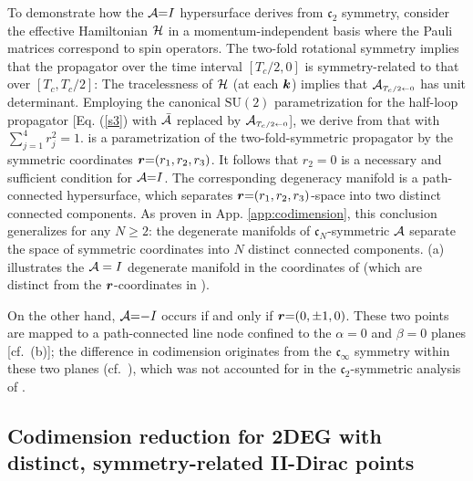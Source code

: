 \documentclass[aps, showpacs, twocolumn, notitlepage, superscriptaddress]{revtex4-1}
\begin{document}
To demonstrate how the ${\cal A}{=}I$ hypersurface derives from $\mathfrak{c}_2$ symmetry, consider  the effective Hamiltonian ${\cal H}$ 
in a momentum-independent basis where the Pauli matrices correspond to spin operators. The two-fold rotational symmetry 
implies that the propagator over the time interval $[T_c/2,0]$ is symmetry-related to that over $[T_c,T_c/2]$:
The tracelessness of ${\cal H}$ (at each $\boldsymbol{k}$) implies that  ${{\cal A}}_{\scriptscriptstyle{T_c/2\leftarrow 0}}$  has unit determinant. Employing the canonical $\text{SU}(2)$ parametrization for the half-loop propagator [Eq. (\ref{s3}) with ${\cal \bar{A}}$ replaced by ${{\cal A}}_{\scriptscriptstyle{T_c/2\leftarrow 0}}$], we derive from  that
with $\sum_{j=1}^4r_j^2{=}1$.  is a parametrization of the two-fold-symmetric propagator by the symmetric coordinates $\boldsymbol{r}{=}(r_1,r_2,r_3)$. It follows that $r_2{=}0$ is a necessary and sufficient condition for ${\cal A}{=}I$. The corresponding degeneracy manifold is a path-connected hypersurface, which separates $\boldsymbol{r}{=}(r_1,r_2,r_3)$-space into two distinct connected components. As proven in App. \ref{app:codimension}, this conclusion generalizes for any $N{\geq}2$: the degenerate manifolds of $\mathfrak{c}_N$-symmetric ${\cal A}$ separate the space of symmetric coordinates into $N$ distinct connected components. (a) illustrates the ${\cal A}=I$ degenerate manifold {in the coordinates of   (which are distinct from the $\boldsymbol{r}$-coordinates in ).} 

On the other hand, ${\cal A}{=}{-}I$ occurs if and only if $\boldsymbol{r}{=}(0,{\pm} 1,0)$. These two points are mapped to a path-connected line node confined to the $\alpha{=}0$ and $\beta{=}0$ planes [cf.\ (b)]; the difference in codimension originates from the $\mathfrak{c}_{\infty}$ symmetry within these two planes (cf.\ ), which was not accounted for in the $\mathfrak{c}_2$-symmetric analysis of .

\subsection{Codimension reduction for 2DEG with distinct, symmetry-related II-Dirac points}\label{sec:rotsymmbreakdown}
\end{document}
